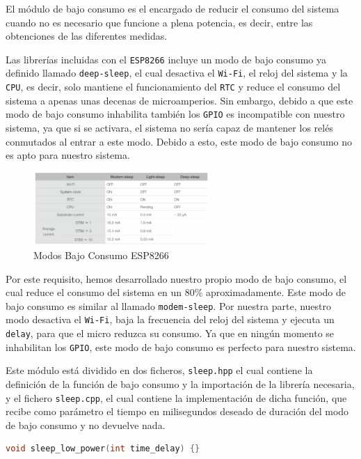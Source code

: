 El módulo de bajo consumo es el encargado de reducir el consumo del sistema cuando no es necesario que funcione a plena potencia, es decir, entre las obtenciones de las diferentes medidas.

Las librerías incluidas con el \texttt{ESP8266} incluye un modo de bajo consumo ya definido llamado \texttt{deep-sleep}, el cual desactiva el \texttt{Wi-Fi}, el reloj del sistema y la \texttt{CPU}, es decir, solo mantiene el funcionamiento del \texttt{RTC} y reduce el consumo del sistema a apenas unas decenas de microamperios. Sin embargo, debido a que este modo de bajo consumo inhabilita también los \texttt{GPIO} es incompatible con nuestro sistema, ya que si se activara, el sistema no sería capaz de mantener los relés conmutados al entrar a este modo. Debido a esto, este modo de bajo consumo no es apto para nuestro sistema. \cite{esp8266ESP8266LowPower}

\begin{figure}[H]
    \centering
    \includegraphics[width=0.6\textwidth]{images/3-software/3-2-5-lowpower/Modos Bajo Consumo.png}
    \caption{Modos Bajo Consumo ESP8266}
    \label{fig:3-2-5-1-ModosBajoConsumo}
\end{figure}

Por este requisito, hemos desarrollado nuestro propio modo de bajo consumo, el cual reduce el consumo del sistema en un $80\%$ aproximadamente. Este modo de bajo consumo es similar al llamado \texttt{modem-sleep}. Por nuestra parte, nuestro modo desactiva el \texttt{Wi-Fi}, baja la frecuencia del reloj del sistema y ejecuta un \texttt{delay}, para que el micro reduzca su consumo. Ya que en ningún momento se inhabilitan los \texttt{GPIO}, este modo de bajo consumo es perfecto para nuestro sistema.

Este módulo está dividido en dos ficheros, \texttt{sleep.hpp} el cual contiene la definición de la función de bajo consumo y la importación de la librería necesaria, y el fichero \texttt{sleep.cpp}, el cual contiene la implementación de dicha función, que recibe como parámetro el tiempo en milisegundos deseado de duración del modo de bajo consumo y no devuelve nada.

\begin{lstlisting}[captionpos=b, caption={Función bajo consumo}, language=c++]
    void sleep_low_power(int time_delay) {}
\end{lstlisting}

